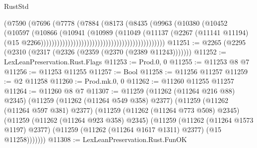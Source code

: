 \begin{lexlean}{RustStd}
\begin{coremodule}
                                                              (@7590
                                                                (@7696
                                                                  (@7778
                                                                    (@7884
                                                                      (@8173
                                                                        (@8435
                                                                          (@9963
                                                                            (@10380
                                                                              (@10452
                                                                                (@10597
                                                                                  (@10866
                                                                                    (@10941
                                                                                      (@10989
                                                                                        (@11049
                                                                                          (@11137
                                                                                            (@2267
                                                                                              (@11141
                                                                                                @11194)
                                                                                              (@15
                                                                                                @2266))))))))))))))))))))))))))))))))))))))))))))))
@11251 := @2265 (@2295 (@2310 (@2317 (@2326 (@2359 (@2370 (@2389 @11243)))))))
@11252 := LexLeanPreservation.Rust.Flags
@11253 := Prod.{0, 0}
@11255 := @11253 @8 @7
@11256 := @11253 @11255
@11257 := Bool
@11258 := @11256 @11257
@11259 := @2 @11258
@11260 := Prod.mk.{0, 0}
@11262 := @11260 @11255 @11257
@11264 := @11260 @8 @7
@11307 := @11259
    (@11262 (@11264 @216 @88) @2345)
    (@11259
      (@11262 (@11264 @549 @358) @2377)
      (@11259
        (@11262 (@11264 @597 @381) @2377)
        (@11259
          (@11262 (@11264 @773 @508) @2345)
          (@11259
            (@11262 (@11264 @923 @358) @2345)
            (@11259
              (@11262 (@11264 @1573 @1197) @2377)
              (@11259 (@11262 (@11264 @1617 @1311) @2377) (@15 @11258)))))))
@11308 := LexLeanPreservation.Rust.FunOK

\end{coremodule}
\end{lexlean}
